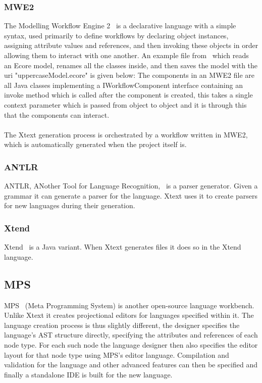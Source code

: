 \documentclass{article}
\begin{document}
\subsubsection{MWE2}
The Modelling Workflow Engine 2~\cite{mwe2} is a declarative language with a simple syntax, used primarily to define workflows by declaring object instances, assigning attribute values and references, and then invoking these objects in order allowing them to interact with one another. An example file from~\cite{mwe2} which reads an Ecore model, renames all the classes inside, and then saves the model with the uri "uppercaseModel.ecore" is given below: 
The components in an MWE2 file are all Java classes implementing a IWorkflowComponent interface containing an invoke method which is called after the component is created, this takes a single context parameter which is passed from object to object and it is through this that the components can interact. 
\\
\\
The Xtext generation process is orchestrated by a workflow written in MWE2, which is automatically generated when the project itself is.
\subsubsection{ANTLR}
ANTLR, ANother Tool for Language Recognition,~\cite{antlr} is a parser generator. Given a grammar it can generate a parser for the language. Xtext uses it to create parsers for new languages during their generation.
\subsubsection{Xtend}
Xtend~\cite{xtend} is a Java variant. When Xtext generates files it does so in the Xtend language.
\subsection{MPS}\label{mps}
MPS~\cite{mps} (Meta Programming System) is another open-source language workbench. Unlike Xtext it creates projectional editors for languages specified within it. The language creation process is thus slightly different, the designer specifies the language's AST structure directly, specifying the attributes and references of each node type. For each such node the language designer then also specifies the editor layout for that node type using MPS's editor language. Compilation and validation for the language and other advanced features can then be specified and finally a standalone IDE is built for the new language. 
\end{document}
